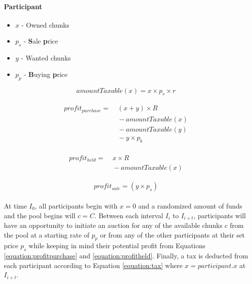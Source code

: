 \paragraph{Participant}

\begin{itemize}
  \item $x$ - Owned chunks
  \item $p_s$ - \textbf{S}ale \textbf{p}rice
  \item $y$ - Wanted chunks
  \item $p_p$ - \textbf{B}uying \textbf{p}rice
\end{itemize}

\begin{equation} \label{equation:tax}
  amountTaxable(x) = x \times p_s \times r
\end{equation}

\begin{align} \label{equation:profitpurchase}
  \begin{split}
    profit_{purchase} = &\; (x + y) \times R \\
    &\; - amountTaxable(x) \\
    &\; - amountTaxable(y) \\
    &\; - y \times p_b
  \end{split}
\end{align}

\begin{align} \label{equation:profitheld}
  \begin{split}
    profit_{held} = &\; x \times R \\
    &\; - amountTaxable(x)
  \end{split}
\end{align}

\begin{equation} \label{equation:profitsale}
  profit_{sale} = (y \times p_s)
\end{equation}

\paragraph{} At time $I_0$, all participants begin with $x = 0$ and a randomized amount of funds and the pool begins will $c = C$. Between each interval $I_i$ to $I_{i + t}$, participants will have an opportunity to initiate an auction for any of the available chunks $c$ from the pool at a starting rate of $p_p$ or from any of the other participants at their set price $p_s$ while keeping in mind their potential profit from Equations \ref{equation:profitpurchase} and \ref{equation:profitheld}. Finally, a tax is deducted from each participant according to Equation \ref{equation:tax} where $x = participant.x$ at $I_{i + t}$.

